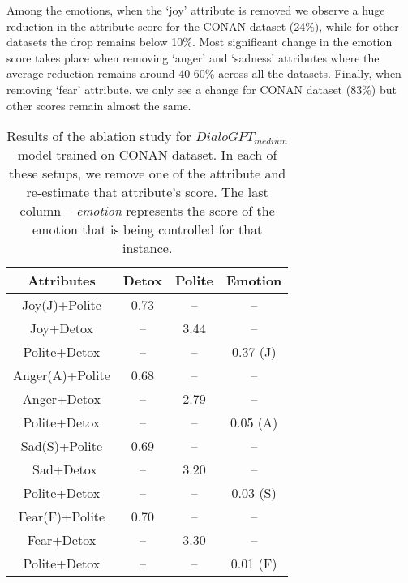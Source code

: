 Among the emotions, when the `joy' attribute is removed we observe a huge reduction in the attribute score for the CONAN dataset (24\%), while for other datasets the drop remains below 10\%. Most significant change in the emotion score takes place when removing `anger' and `sadness' attributes where the average reduction remains around 40-60\% across all the datasets. Finally, when removing `fear' attribute, we only see a change for CONAN dataset (83\%) but other scores remain almost the same.
\begin{table}[!htpb]
\centering
\footnotesize{
\begin{tabular}{|c|c|c|c|}
\hline
\textbf{Attributes}          & \textbf{Detox}              & \textbf{Polite}           & \textbf{Emotion} \\ \hline
Joy(J)+Polite   &    0.73             &  --               & --        \\ 
Joy+Detox    &    --                &  3.44             & --        \\ 
Polite+Detox    &    --                &  --               & 0.37 (J)        \\ \hline
Anger(A)+Polite &    0.68            &  --               & --        \\ 
Anger+Detox  &     --             &  2.79             & --        \\ 
Polite+Detox    &     --             &  --               & 0.05 (A)       \\ \hline
Sad(S)+Polite   &     0.69             & --               & --        \\ \
Sad+Detox   &     --             &  3.20               & --        \\ 
Polite+Detox   &     --             &  --               & 0.03 (S)        \\ \hline
Fear(F)+Polite  &     0.70           & --               & --        \\ 
Fear+Detox  &      --             &  3.30            & --        \\
Polite+Detox  &       --             &  --               & 0.01 (F)        \\ \hline

\end{tabular}
}
\caption{\footnotesize{Results of the ablation study for $DialoGPT_{medium}$ model trained on CONAN dataset. In each of these setups, we remove one of the attribute and re-estimate that attribute's score. The last column -- \textit{emotion} represents the score of the emotion that is being controlled for that instance.}}
\label{tab:multi-attribute-ablation-conan}
\end{table}



